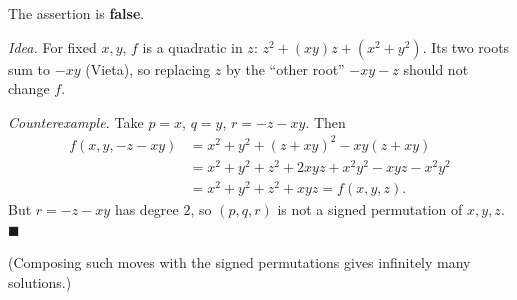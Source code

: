 The assertion is \textbf{false}.

\emph{Idea.} For fixed $x,y$, $f$ is a quadratic in $z$: $z^2+(xy)z+\left(x^2+y^2\right)$. Its two roots sum to $-xy$ (Vieta), so replacing $z$ by the ``other root'' $-xy-z$ should not change $f$.

\emph{Counterexample.} Take $p=x$, $q=y$, $r=-z-xy$. Then
\begin{align*}
f(x,y,-z-xy)&=x^2+y^2+(z+xy)^2-xy(z+xy)\\
&=x^2+y^2+z^2+2xyz+x^2y^2-xyz-x^2y^2\\
&=x^2+y^2+z^2+xyz=f(x,y,z).
\end{align*}
But $r=-z-xy$ has degree $2$, so $(p,q,r)$ is not a signed permutation of $x,y,z$. $\blacksquare$

(Composing such moves with the signed permutations gives infinitely many solutions.)
